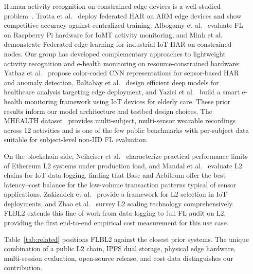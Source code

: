\documentclass{llncs}
\begin{document}
Human activity recognition on constrained edge devices is a well-studied
problem~\cite{aouedi2024harsurvey,shiri2025dlharsurvey}. Trotta et
al.~\cite{trotta2024edgehar} deploy federated HAR on ARM edge devices and
show competitive accuracy against centralized training. Albogamy et
al.~\cite{albogamy2025iotfl} evaluate FL on Raspberry Pi hardware for
IoMT activity monitoring, and Minh et al.~\cite{minh2025iiot} demonstrate
Federated edge learning for industrial IoT HAR on constrained nodes. Our group has developed complementary approaches to lightweight activity
recognition and e-health monitoring on resource-constrained hardware:
Yatbaz et al.~\cite{yatbaz2021activity} propose color-coded CNN
representations for sensor-based HAR and anomaly detection, Baltabay et
al.~\cite{baltabay2023lightweight} design efficient deep models for
healthcare analysis targeting edge deployment, and Yazici et
al.~\cite{yazici2023ehealth} build a smart e-health monitoring framework
using IoT devices for elderly care. These prior results inform our model
architecture and testbed design choices. The MHEALTH
dataset~\cite{banos2014mhealth} provides multi-subject, multi-sensor
wearable recordings across 12 activities and is one of the few public
benchmarks with per-subject data suitable for subject-level non-IID FL
evaluation.

On the blockchain side, Neiheiser et al.~\cite{neiheiser2023l2limits}
characterize practical performance limits of Ethereum L2 systems under
production load, and Mandal et al.~\cite{mandal2023l2} evaluate L2 chains
for IoT data logging, finding that Base and Arbitrum offer the best
latency--cost balance for the low-volume transaction patterns typical of
sensor applications. Zakizadeh et al.~\cite{zakizadeh2025l2select} provide
a framework for L2 selection in IoT deployments, and Zhao et
al.~\cite{zhao2024l2intro} survey L2 scaling technology comprehensively.
FLBL2 extends this line of work from data logging to full FL audit on L2,
providing the first end-to-end empirical cost measurement for this use case.

Table~\ref{tab:related} positions FLBL2 against the closest prior systems.
The unique combination of a public L2 chain, IPFS dual storage, physical
edge hardware, multi-session evaluation, open-source release, and cost data
distinguishes our contribution.
\end{document}
